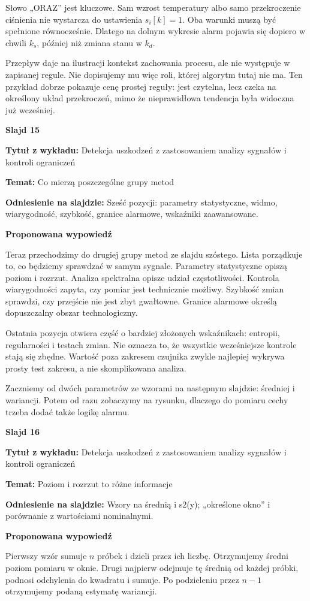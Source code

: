 \documentclass[a4paper,11pt]{article}
\newcommand{\NumerSlajdu}{1}
\newcommand{\Komentarz}[3]{%
  \gdef\NumerSlajdu{#1}%
  {\Large\bfseries Slajd #1\par}\smallskip
  \textbf{Tytuł z wykładu:} #2\par
  \textbf{Temat:} #3\par\medskip
}
\begin{document}
Słowo „ORAZ” jest kluczowe. Sam wzrost temperatury albo samo przekroczenie ciśnienia nie wystarcza do ustawienia $s_i[k]=1$. Oba warunki muszą być spełnione równocześnie. Dlatego na dolnym wykresie alarm pojawia się dopiero w chwili $k_s$, później niż zmiana stanu w $k_d$.

Przepływ daje na ilustracji kontekst zachowania procesu, ale nie występuje w zapisanej regule. Nie dopisujemy mu więc roli, której algorytm tutaj nie ma. Ten przykład dobrze pokazuje cenę prostej reguły: jest czytelna, lecz czeka na określony układ przekroczeń, mimo że nieprawidłowa tendencja była widoczna już wcześniej.
\clearpage

\Komentarz{15}{Detekcja uszkodzeń z zastosowaniem analizy sygnałów i kontroli ograniczeń}{Co mierzą poszczególne grupy metod}
{\small\color{black!65}\textbf{Odniesienie na slajdzie:} Sześć pozycji: parametry statystyczne, widmo, wiarygodność, szybkość, granice alarmowe, wskaźniki zaawansowane.\par}
\medskip
\textbf{Proponowana wypowiedź}\par
Teraz przechodzimy do drugiej grupy metod ze slajdu szóstego. Lista porządkuje to, co będziemy sprawdzać w samym sygnale. Parametry statystyczne opiszą poziom i rozrzut. Analiza spektralna opisze udział częstotliwości. Kontrola wiarygodności zapyta, czy pomiar jest technicznie możliwy. Szybkość zmian sprawdzi, czy przejście nie jest zbyt gwałtowne. Granice alarmowe określą dopuszczalny obszar technologiczny.

Ostatnia pozycja otwiera część o bardziej złożonych wskaźnikach: entropii, regularności i testach zmian. Nie oznacza to, że wszystkie wcześniejsze kontrole stają się zbędne. Wartość poza zakresem czujnika zwykle najlepiej wykrywa prosty test zakresu, a nie skomplikowana analiza.

Zaczniemy od dwóch parametrów ze wzorami na następnym slajdzie: średniej i wariancji. Potem od razu zobaczymy na rysunku, dlaczego do pomiaru cechy trzeba dodać także logikę alarmu.
\clearpage

\Komentarz{16}{Detekcja uszkodzeń z zastosowaniem analizy sygnałów i kontroli ograniczeń}{Poziom i rozrzut to różne informacje}
{\small\color{black!65}\textbf{Odniesienie na slajdzie:} Wzory na średnią i s2(y); „określone okno” i porównanie z wartościami nominalnymi.\par}
\medskip
\textbf{Proponowana wypowiedź}\par
Pierwszy wzór sumuje $n$ próbek i dzieli przez ich liczbę. Otrzymujemy średni poziom pomiaru w oknie. Drugi najpierw odejmuje tę średnią od każdej próbki, podnosi odchylenia do kwadratu i sumuje. Po podzieleniu przez $n-1$ otrzymujemy podaną estymatę wariancji.
\end{document}
